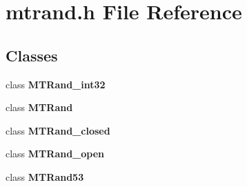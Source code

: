 \section{mtrand.h File Reference}
\label{mtrand_8h}


\subsection*{Classes}
\begin{CompactItemize}
\item 
class {\bf MTRand\_\-int32}
\item 
class {\bf MTRand}
\item 
class {\bf MTRand\_\-closed}
\item 
class {\bf MTRand\_\-open}
\item 
class {\bf MTRand53}
\end{CompactItemize}
